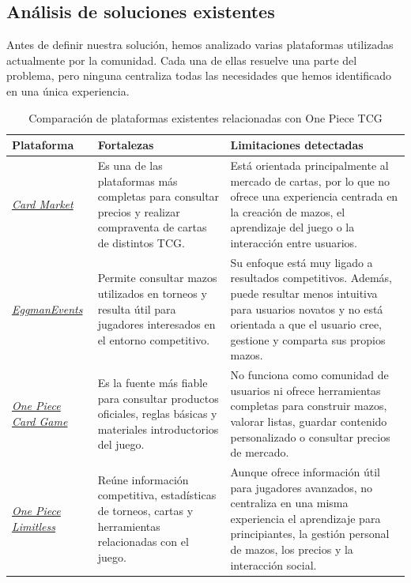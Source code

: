 \documentclass[10pt]{article}
\begin{document}
    \subsection{Análisis de soluciones existentes}        
        Antes de definir nuestra solución, hemos analizado varias plataformas utilizadas actualmente por la comunidad. Cada una de ellas resuelve una parte del problema, pero ninguna centraliza todas las necesidades que hemos identificado en una única experiencia.
        
        \begin{table}[H]
            \centering
            \renewcommand{\arraystretch}{1.3}
            \begin{tabular}{|p{3.2cm}|p{5.2cm}|p{5.2cm}|}
                \hline
                \textbf{Plataforma} & \textbf{Fortalezas} & \textbf{Limitaciones detectadas} \\
                \hline
                    \href{https://www.cardmarket.com/es/OnePiece}{\textit{Card Market}} & Es una de las plataformas más completas para consultar precios y realizar compraventa de cartas de distintos TCG. & Está orientada principalmente al mercado de cartas, por lo que no ofrece una experiencia centrada en la creación de mazos, el aprendizaje del juego o la interacción entre usuarios. \\
                \hline
                    \href{https://deckbuilder.egmanevents.com/optcg/cards}{\textit{EggmanEvents}} & Permite consultar mazos utilizados en torneos y resulta útil para jugadores interesados en el entorno competitivo. & Su enfoque está muy ligado a resultados competitivos. Además, puede resultar menos intuitiva para usuarios novatos y no está orientada a que el usuario cree, gestione y comparta sus propios mazos. \\
                \hline
                    \href{https://en.onepiece-cardgame.com/beginners/}{\textit{One Piece Card Game}} & Es la fuente más fiable para consultar productos oficiales, reglas básicas y materiales introductorios del juego. & No funciona como comunidad de usuarios ni ofrece herramientas completas para construir mazos, valorar listas, guardar contenido personalizado o consultar precios de mercado. \\
                \hline
                
                    \href{https://onepiece.limitlesstcg.com}{\textit{One Piece Limitless}} & Reúne información competitiva, estadísticas de torneos, cartas y herramientas relacionadas con el juego. & Aunque ofrece información útil para jugadores avanzados, no centraliza en una misma experiencia el aprendizaje para principiantes, la gestión personal de mazos, los precios y la interacción social. \\
                \hline
            \end{tabular}
            \caption{Comparación de plataformas existentes relacionadas con One Piece TCG}
        \end{table}
\end{document}
